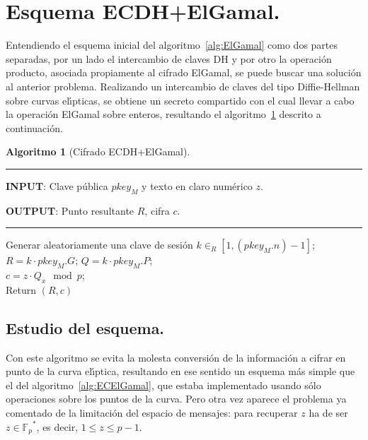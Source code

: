 \documentclass{cedi}%
\def\ce{curva{} el\'{\i}ptica}%
\def\ces{curvas{} el\'{\i}pticas}%
\newcommand{\Fp}{\ensuremath{\mathbb{F}_p}}%
\theoremstyle{plain}        			%
\theoremstyle{definition}   			%
\theoremstyle{saltolinea}   			%
\newtheorem{algo}{Algoritmo}
\begin{document}
\section{Esquema ECDH+ElGamal.}

Entendiendo el esquema inicial del algoritmo~\ref{alg:ElGamal} como dos partes separadas, por un lado el intercambio de claves DH y por otro la operaci\'on producto, asociada propiamente al cifrado ElGamal, se puede buscar una soluci\'on al anterior problema. Realizando un intercambio de claves del tipo Diffie-Hellman sobre \ces{}, se obtiene un secreto compartido con el cual llevar a cabo la operaci\'on ElGamal sobre enteros, resultando el algoritmo~\ref{alg:ECDH} descrito a continuaci\'on.

\begin{algo}[Cifrado ECDH+ElGamal]\label{alg:ECDH}
\parbox[b]{\linewidth}{%
\hrule
\smallskip
{\bf INPUT}: Clave p\'ublica $pkey_{M}$ y texto en claro num\'erico $z$.

{\bf OUTPUT}: Punto resultante $R$, cifra $c$.
\vspace{1.5mm}
\hrule
}%
\begin{algorithmic}[1]
\STATE Generar aleatoriamente una clave de sesi\'on $k\in_{R}\left[1,\left(pkey_{M}.n\right)-1\right]$;
\STATE $R=k\cdot pkey_{M}.G$;
\STATE $Q=k\cdot pkey_{M}.P$; \\
\STATE $c=z\cdot Q_x\mod p$; \\
\STATE Return $(R,c)$
\end{algorithmic}
\end{algo}


\subsection*{Estudio del esquema.}

Con este algoritmo se evita la molesta conversi\'on de la informaci\'on a cifrar en punto de la \ce{}, resultando en ese sentido un esquema m\'as simple que el del algoritmo~\ref{alg:ECElGamal}, que estaba implementado usando s\'olo operaciones sobre los puntos de la curva. Pero otra vez aparece el problema ya comentado de la limitaci\'on del espacio de mensajes: para recuperar $z$ ha de ser $z\in\Fp^*$, es decir, $1\le z\le p-1$.
\end{document}
